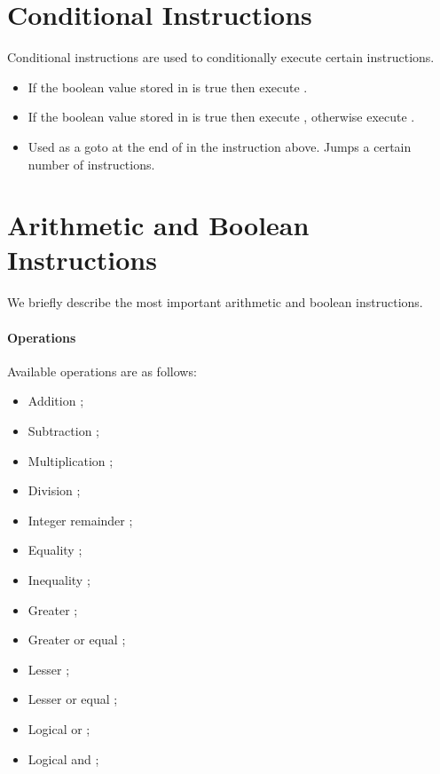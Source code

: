 \section{Conditional Instructions} Conditional instructions are used to
conditionally execute certain instructions.

\begin{itemize}
   \item {}

   If the boolean value stored in  is true then execute .

   \item {}

   If the boolean value stored in  is true then execute ,
   otherwise execute .

   \item {}

   Used as a goto at the end of  in the instruction above. Jumps a
   certain number of instructions.

\end{itemize}

\section{Arithmetic and Boolean Instructions}

We briefly describe the most important arithmetic and boolean instructions.

\paragraph{Operations}

Available operations are as follows:

\begin{itemize}
   \item Addition \code{+};
   \item Subtraction \code{-};
   \item Multiplication \code{*};
   \item Division \code{/};
   \item Integer remainder \code{\%};
   \item Equality \code{=};
   \item Inequality \code{<>};
   \item Greater \code{>};
   \item Greater or equal \code{>=};
   \item Lesser \code{<};
   \item Lesser or equal \code{<=};
   \item Logical or ;
   \item Logical and ;
\end{itemize}

